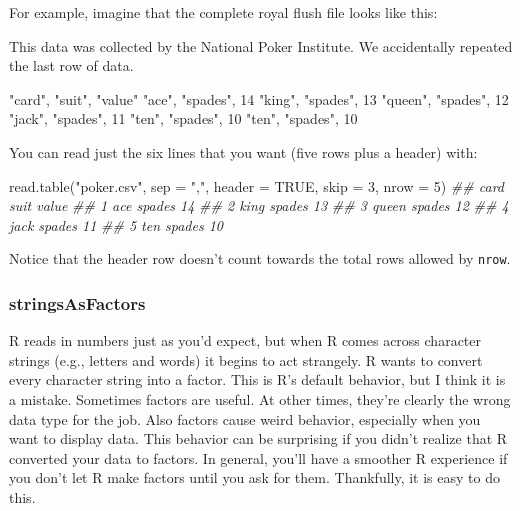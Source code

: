 \documentclass[
  letterpaper,
  DIV=11,
  numbers=noendperiod]{scrbook}
\newenvironment{Shaded}{\begin{snugshade}}{\end{snugshade}}
\newcommand{\AttributeTok}[1]{\textcolor[rgb]{0.40,0.45,0.13}{#1}}
\newcommand{\ConstantTok}[1]{\textcolor[rgb]{0.56,0.35,0.01}{#1}}
\newcommand{\DecValTok}[1]{\textcolor[rgb]{0.68,0.00,0.00}{#1}}
\newcommand{\DocumentationTok}[1]{\textcolor[rgb]{0.37,0.37,0.37}{\textit{#1}}}
\newcommand{\FunctionTok}[1]{\textcolor[rgb]{0.28,0.35,0.67}{#1}}
\newcommand{\NormalTok}[1]{\textcolor[rgb]{0.00,0.23,0.31}{#1}}
\newcommand{\StringTok}[1]{\textcolor[rgb]{0.13,0.47,0.30}{#1}}
\begin{document}
For example, imagine that the complete royal flush file looks like this:

\begin{Shaded}
\begin{Highlighting}[]
\NormalTok{This data was collected by the National Poker Institute. }
\NormalTok{We accidentally repeated the last row of data.}

\StringTok{"card"}\NormalTok{, }\StringTok{"suit"}\NormalTok{, }\StringTok{"value"}
\StringTok{"ace"}\NormalTok{, }\StringTok{"spades"}\NormalTok{, }\DecValTok{14}
\StringTok{"king"}\NormalTok{, }\StringTok{"spades"}\NormalTok{, }\DecValTok{13}
\StringTok{"queen"}\NormalTok{, }\StringTok{"spades"}\NormalTok{, }\DecValTok{12}
\StringTok{"jack"}\NormalTok{, }\StringTok{"spades"}\NormalTok{, }\DecValTok{11}
\StringTok{"ten"}\NormalTok{, }\StringTok{"spades"}\NormalTok{, }\DecValTok{10}
\StringTok{"ten"}\NormalTok{, }\StringTok{"spades"}\NormalTok{, }\DecValTok{10}
\end{Highlighting}
\end{Shaded}

You can read just the six lines that you want (five rows plus a header)
with:

\begin{Shaded}
\begin{Highlighting}[]
\FunctionTok{read.table}\NormalTok{(}\StringTok{"poker.csv"}\NormalTok{, }\AttributeTok{sep =} \StringTok{","}\NormalTok{, }\AttributeTok{header =} \ConstantTok{TRUE}\NormalTok{, }\AttributeTok{skip =} \DecValTok{3}\NormalTok{, }\AttributeTok{nrow =} \DecValTok{5}\NormalTok{)}
\DocumentationTok{\#\#    card    suit value}
\DocumentationTok{\#\# 1   ace  spades    14}
\DocumentationTok{\#\# 2  king  spades    13}
\DocumentationTok{\#\# 3 queen  spades    12}
\DocumentationTok{\#\# 4  jack  spades    11}
\DocumentationTok{\#\# 5   ten  spades    10}
\end{Highlighting}
\end{Shaded}

Notice that the header row doesn't count towards the total rows allowed
by \texttt{nrow}.

\subsubsection{stringsAsFactors}\label{stringsasfactors}

R reads in numbers just as you'd expect, but when R comes across
character strings (e.g., letters and words) it begins to act strangely.
R wants to convert every character string into a factor. This is R's
default behavior, but I think it is a mistake. Sometimes factors are
useful. At other times, they're clearly the wrong data type for the job.
Also factors cause weird behavior, especially when you want to display
data. This behavior can be surprising if you didn't realize that R
converted your data to factors. In general, you'll have a smoother R
experience if you don't let R make factors until you ask for them.
Thankfully, it is easy to do this.
\end{document}
